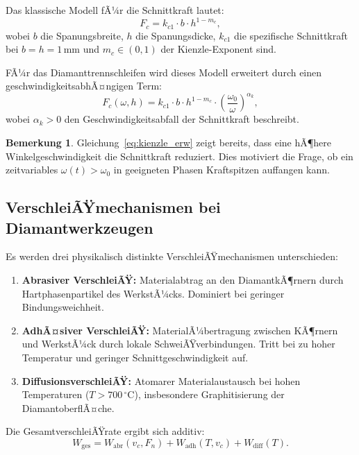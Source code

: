 ﻿\documentclass[a4paper,12pt]{article}
\theoremstyle{definition}
\newtheorem{bemerkung}{Bemerkung}
\begin{document}
Das klassische Modell fÃ¼r die Schnittkraft lautet:
\[
F_c = k_{c1} \cdot b \cdot h^{1 - m_c},
\]
wobei $b$ die Spanungsbreite, $h$ die Spanungsdicke, $k_{c1}$ die spezifische
Schnittkraft bei $b = h = 1\,\mathrm{mm}$ und $m_c \in (0,1)$ der Kienzle-Exponent sind.

FÃ¼r das Diamanttrennschleifen wird dieses Modell erweitert durch einen
geschwindigkeitsabhÃ¤ngigen Term:
\begin{equation}
\label{eq:kienzle_erw}
F_c(\omega, h) = k_{c1} \cdot b \cdot h^{1-m_c} \cdot \left(\frac{\omega_0}{\omega}\right)^{\alpha_k},
\end{equation}
wobei $\alpha_k > 0$ den Geschwindigkeitsabfall der Schnittkraft beschreibt.

\begin{bemerkung}
Gleichung~\eqref{eq:kienzle_erw} zeigt bereits, dass eine hÃ¶here Winkelgeschwindigkeit
die Schnittkraft reduziert. Dies motiviert die Frage, ob ein zeitvariables $\omega(t) > \omega_0$
in geeigneten Phasen Kraftspitzen auffangen kann.
\end{bemerkung}

\subsection{VerschleiÃŸmechanismen bei Diamantwerkzeugen}

Es werden drei physikalisch distinkte VerschleiÃŸmechanismen unterschieden:

\begin{enumerate}
\item \textbf{Abrasiver VerschleiÃŸ:} Materialabtrag an den DiamantkÃ¶rnern durch
      Hartphasenpartikel des WerkstÃ¼cks. Dominiert bei geringer Bindungsweichheit.
\item \textbf{AdhÃ¤siver VerschleiÃŸ:} MaterialÃ¼bertragung zwischen KÃ¶rnern und WerkstÃ¼ck
      durch lokale SchweiÃŸverbindungen. Tritt bei zu hoher Temperatur und geringer
      Schnittgeschwindigkeit auf.
\item \textbf{DiffusionsverschleiÃŸ:} Atomarer Materialaustausch bei hohen Temperaturen
      ($T > 700\,^\circ\mathrm{C}$), insbesondere Graphitisierung der DiamantoberflÃ¤che.
\end{enumerate}

Die GesamtverschleiÃŸrate ergibt sich additiv:
\begin{equation}
\label{eq:verschleiss_gesamt}
W_{\mathrm{ges}} = W_{\mathrm{abr}}(v_c, F_n) + W_{\mathrm{adh}}(T, v_c) + W_{\mathrm{diff}}(T).
\end{equation}
\end{document}
